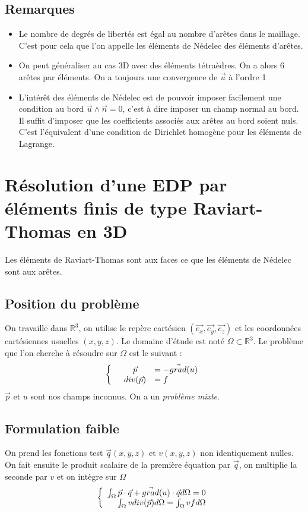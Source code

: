 \documentclass[a4paper,12pt]{article}
\begin{document}
\subsection{Remarques}
\begin{itemize}
\item Le nombre de degrés de libertés est égal au nombre d'arêtes dans le maillage. C'est pour cela que l'on appelle les éléments de Nédelec des éléments d'arêtes.
\item On peut généraliser au cas 3D  avec des éléments tétraèdres. On a alors 6 arêtes par éléments. On a toujours une convergence de $\vec{u}$ à l'ordre 1
\item L'intérêt des éléments de Nédelec est de pouvoir imposer facilement une condition au bord $\vec{u} \wedge \vec{n}=0$, c'est à dire imposer un champ normal au bord.
Il suffit d'imposer que les coefficients associés aux arêtes au bord soient nuls. C'est l'équivalent d'une condition de Dirichlet homogène pour les éléments de Lagrange. 
\end{itemize}
\newpage
\section{Résolution d'une EDP par éléments finis de type Raviart-Thomas en 3D}
Les éléments de Raviart-Thomas sont aux faces ce que les éléments de Nédelec sont aux arêtes.
\subsection{Position du problème}
On travaille dans $\mathbb{R}^3$, on utilise le repère cartésien $(\vec{e_{x}}, \vec{e_{y}}, \vec{e_{z}})$ 
et les coordonnées cartésiennes usuelles $(x,y,z)$. Le domaine d'étude est noté $\Omega \subset \mathbb{R}^3$. 
Le problème que l'on cherche à résoudre sur $\Omega$ est le suivant :
\[
\left\{
\begin{array}{r c l}
&\vec{p} &= -\vec{grad}(u) \\
&div(\vec{p}) &= f
\end{array}
\right.
\]
$\vec{p}$ et $u$ sont nos champs inconnus. On a un \emph{problème mixte}.
\subsection{Formulation faible}
On prend les fonctions test $\vec{q}(x,y,z)$ et $v(x,y,z)$ non identiquement nulles. 
On fait ensuite le produit scalaire de la première équation par $\vec{q}$, on multiplie la seconde par $v$ et on intègre sur $\Omega$
\[
\left\{
\begin{array}{r c l}
\int_{\Omega} {\vec{p}\cdot\vec{q} + \vec{grad}(u)\cdot\vec{q}  d\Omega} = 0 \\
\int_{\Omega} {v div(\vec{p})  d\Omega} = \int_{\Omega} {v f  d\Omega} \\
\end{array}
\right.
\]
\end{document}
